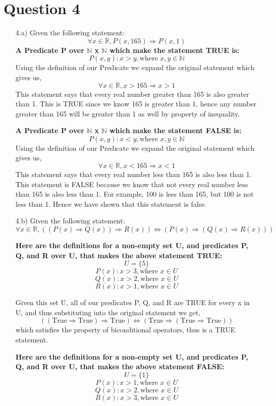 \documentclass[20pt]{article}
\begin{document}
\section*{Question 4}
\begin{enumerate}
\item [4.a)] Given the following statement: \[\forall x \in \mathbb{R}, P(x, 165) \Rightarrow P(x,1)\]
\textbf{A Predicate P over $\mathbb{N}$ x $\mathbb{N}$ which make the statement TRUE is:}
\[P(x, y): x > y, \text{where } x, y \in \mathbb{N}\]
Using the definition of our Predicate we expand the original statement which gives us,
\[\forall x \in \mathbb{R}, x > 165  \Rightarrow x > 1\]
This statement says that every real number greater than 165 is also greater than 1. This is TRUE since we know 165 is greater than 1, hence any number greater than 165 will be greater than 1 as well by property of inequality.

\textbf{A Predicate P over $\mathbb{N}$ x $\mathbb{N}$ which make the statement FALSE is:}
\[P(x, y): x < y, \text{where } x, y \in \mathbb{N}\]
Using the definition of our Predicate we expand the original statement which gives us,
\[\forall x \in \mathbb{R}, x < 165  \Rightarrow x < 1\]
This statement says that every real number less than 165 is also less than 1. \\
This statement is FALSE because we know that not every real number less than 165 is also less than 1. For example, 100 is less than 165, but 100 is not less than 1. Hence we have shown that this statement is false. 
\newpage
\item [4.b)] Given the following statement: 
\[\forall x \in \mathbb{R}, ((P(x) \Rightarrow Q(x)) \Rightarrow R(x)) \Leftrightarrow (P(x) \Rightarrow (Q(x) \Rightarrow R(x)))\]

\textbf{Here are the definitions for a non-empty set U, and predicates P, Q, and R over U, that makes the above statement TRUE:}
\[U = \{5\} \]
\[P(x): x > 3, \text{where } x \in U\]
\[Q(x): x > 2, \text{where } x \in U\]
\[R(x): x > 1, \text{where } x \in U\]

Given this set U, all of our predicates P, Q, and R are TRUE for every x in U, and thus substituting into the original statement we get, 
\[((\text{True} \Rightarrow \text{True}) \Rightarrow \text{True}) \Leftrightarrow (\text{True} \Rightarrow (\text{True} \Rightarrow \text{True}))\]
which satisfies the property of biconditional operators, thus is a TRUE statement.


\textbf{Here are the definitions for a non-empty set U, and predicates P, Q, and R over U, that makes the above statement FALSE:}
\[U = \{1\} \]
\[P(x): x > 1, \text{where } x \in U\]
\[Q(x): x > 2, \text{where } x \in U\]
\[R(x): x > 3, \text{where } x \in U\]


\end{enumerate}
\end{document}
